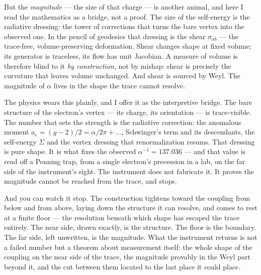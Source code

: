 But the \emph{magnitude} --- the size of that charge --- is another animal, and here I read the mathematics as a
bridge, not a proof. The size of the self-energy is the radiative dressing: the tower of corrections that turns the
bare vertex into the observed one. In the pencil of geodesics that dressing is the shear $\sigma_{ab}$ --- the
trace-free, volume-preserving deformation. Shear changes shape at fixed volume; its generator is traceless, its flow
has unit Jacobian. A measure of volume is therefore blind to it \emph{by construction}, not by mishap: shear is
precisely the curvature that leaves volume unchanged. And shear is sourced by Weyl. The magnitude of \(\alpha\) lives
in the shape the trace cannot resolve.

The physics wears this plainly, and I offer it as the interpretive bridge. The bare structure of the electron's
vertex --- its charge, its orientation --- is trace-visible. The number that sets the strength is the radiative
correction: the anomalous moment $a_e=(g-2)/2=\alpha/2\pi+\dots$, Schwinger's term and its descendants, the
self-energy $\Sigma$ and the vertex dressing that renormalization resums. That dressing is pure shape. It is what
fixes the observed $\alpha^{-1}=137.036$ --- and that value is read off a Penning trap, from a single electron's
precession in a lab, on the far side of the instrument's sight. The instrument does not fabricate it. It proves the
magnitude cannot be reached from the trace, and stops.

And you can watch it stop. The construction tightens toward the coupling from below and from above, laying down the
structure it can resolve, and comes to rest at a finite floor --- the resolution beneath which shape has escaped the
trace entirely. The near side, drawn exactly, is the structure. The floor is the boundary. The far side, left
unwritten, is the magnitude. What the instrument returns is not a failed number but a theorem about measurement
itself: the whole shape of the coupling on the near side of the trace, the magnitude provably in the Weyl part beyond
it, and the cut between them located to the last place it could place.
